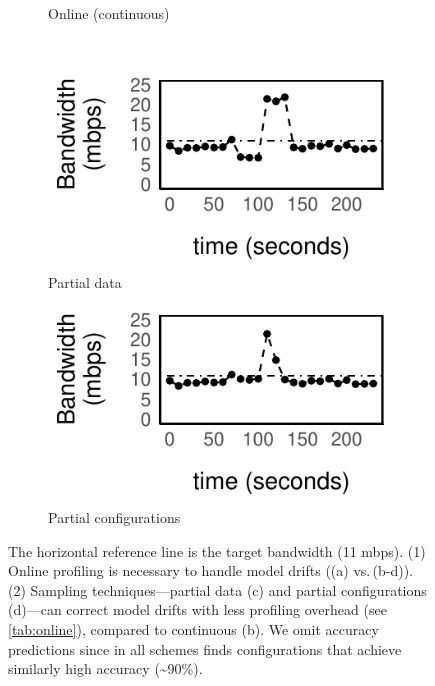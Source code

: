\begin{figure}
\begin{subfigure}[t]{0.48\columnwidth}
    \caption{Online (continuous)}
    \label{fig:online}
  \end{subfigure}
  \\
  \vspace{1.5em}
  \begin{subfigure}[t]{0.49\columnwidth}
    \includegraphics[width=\textwidth]{figures/online3.pdf}
    \caption{Partial data}
    \label{fig:online-partial}
  \end{subfigure}
  \hfill
  \begin{subfigure}[t]{0.49\columnwidth}
    \includegraphics[width=\textwidth]{figures/online4.pdf}
    \caption{Partial configurations}
    \label{fig:online-trigger}
  \end{subfigure}
  \caption{The horizontal reference line is the target bandwidth (11 mbps). (1)
    Online profiling is necessary to handle model drifts ((a) vs.\,(b-d)). (2)
    Sampling techniques---partial data (c) and partial configurations (d)---can
    correct model drifts with less profiling overhead (see
    \autoref{tab:online}), compared to continuous (b).  We omit accuracy
    predictions since in all schemes \sysname{} finds configurations that
    achieve similarly high accuracy (\textasciitilde 90\%).  }
  \label{fig:online-tricks}
\end{figure}

